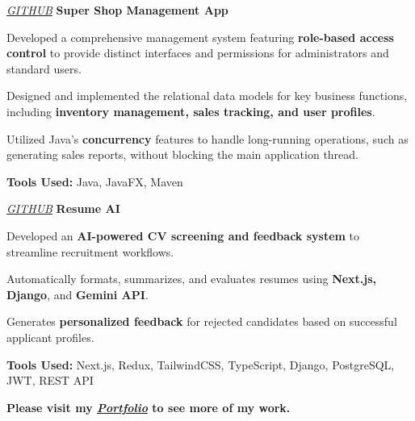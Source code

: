     \vspace{0.2 cm}

    \begin{twocolentry}{
    \textit{\href{https://github.com/ehsan18t/super-shop-javafx}{GITHUB}}}
        \textbf{Super Shop Management App}
    \end{twocolentry}

    \begin{onecolentry}
        \begin{highlights}
            \item Developed a comprehensive management system featuring \textbf{role-based access control} to provide distinct interfaces and permissions for administrators and standard users.
            \item Designed and implemented the relational data models for key business functions, including \textbf{inventory management, sales tracking, and user profiles}.
            \item Utilized Java's \textbf{concurrency} features to handle long-running operations, such as generating sales reports, without blocking the main application thread.
            \item \textbf{Tools Used:} Java, JavaFX, Maven
        \end{highlights}
    \end{onecolentry}

    \vspace{0.2 cm}

    \begin{twocolentry}{
    \textit{\href{https://github.com/ehsan18t/resume-ai}{GITHUB}}}
        \textbf{Resume AI}
    \end{twocolentry}

    \begin{onecolentry}
        \begin{highlights}
            \item Developed an \textbf{AI-powered CV screening and feedback system} to streamline recruitment workflows.
            \item Automatically formats, summarizes, and evaluates resumes using \textbf{Next.js, Django}, and \textbf{Gemini API}.
            \item Generates \textbf{personalized feedback} for rejected candidates based on successful applicant profiles.
            \vspace{0.1 cm}
            \item \textbf{Tools Used:} Next.js, Redux, TailwindCSS, TypeScript, Django, PostgreSQL, JWT, REST API
        \end{highlights}
    \end{onecolentry}

    \vspace{0.3 cm}
    \textbf{Please visit my \textit{\href{https://ehsankhan.me}{Portfolio}} to see more of my work.}